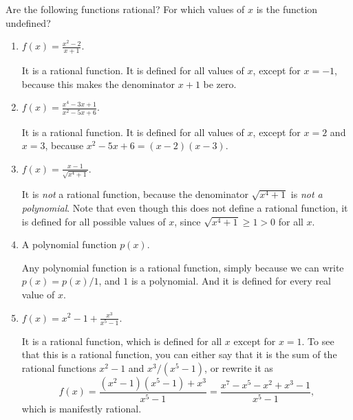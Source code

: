 \documentclass{ximera}
\begin{document}
\begin{example} Are the following functions rational? For which values of $x$ is the function undefined?
  \begin{enumerate}
  \item $f(x) = \frac{x^2-2}{x+1}$. \\[1em]
    \begin{explanation}
      It is a rational function. It is defined for all values of $x$, except for $x = -1$, because this makes the denominator $x+1$ be zero.
    \end{explanation}
  \item $f(x) = \frac{x^4-3x+1}{x^2-5x+6}$. \\[1em]
    \begin{explanation}
      It is a rational function. It is defined for all values of $x$, except for $x=2$ and $x=3$, because $x^2-5x+6 = (x-2)(x-3)$. 
    \end{explanation}
  \item $f(x) = \frac{x-1}{\sqrt{x^4+1}}$. \\[1em]
    \begin{explanation}
      It is \emph{not} a rational function, because the denominator $\sqrt{x^4+1}$ is \emph{not a polynomial}. Note that even though this does not define a rational function, it is defined for all possible values of $x$, since $\sqrt{x^4+1} \geq 1 > 0$ for all $x$.
    \end{explanation}
  \item A polynomial function $p(x)$. \\[1em]
    \begin{explanation}
      Any polynomial function is a rational function, simply because we can write $p(x) = p(x)/1$, and $1$ is a polynomial. And it is defined for every real value of $x$.
    \end{explanation}
  \item $f(x) = x^2-1 + \frac{x^3}{x^5-1}$. \\[1em]
    \begin{explanation}
      It is a rational function, which is defined for all $x$ except for $x=1$. To see that this is a rational function, you can either say that it is the sum of the rational functions $x^2-1$ and $x^3/(x^5-1)$, or rewrite it as \[  f(x) = \frac{(x^2-1)(x^5-1) + x^3}{x^5-1} = \frac{x^7-x^5-x^2+x^3-1}{x^5-1},  \]which is manifestly rational.
    \end{explanation}
  \end{enumerate}
\end{example}
\end{document}
